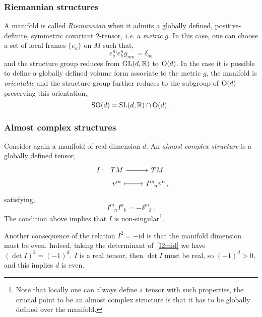 \documentclass[debug]{phd}
\begin{document}
					\subsubsection{Riemannian structures}
						A manifold is called \emph{Riemannian} when it admits a globally defined, positive-definite, symmetric covariant $2$-tensor, \emph{i.e.} a \emph{metric} $g$.
						In this case, one can choose a set of local frames $\{e_a\}$ on $M$ such that,
								\begin{equation}
									e_a^m e_b^n g_{mn} = \delta_{ab}
								\end{equation}
						and the structure group reduces from $\mathrm{GL}(d,\mathbb{R})$ to $\mathrm{O}(d)$.
						In the case it is possible to define a globally defined volume form associate to the metric $g$, the manifold is \emph{orientable} and the structure group further reduces to the subgroup of $\mathrm{O}(d)$ preserving this orientation,
								\begin{equation}
									\mathrm{SO}(d) = \mathrm{SL}(d,\mathbb{R}) \cap \mathrm{O}(d)\, .
								\end{equation}
					\subsubsection{Almost complex structures}
						Consider again a manifold of real dimension $d$. 
						An \emph{almost complex structure} is a globally defined tensor,
								\begin{equation}
									\begin{tikzcd}[row sep=tiny]
										I :\!\!\!\!\!\!\!\!\!\!\!\!\!\!\!\!\! & TM \arrow{r} & TM \\
 											& v^m \arrow[mapsto]{r} & I^m_{\phantom{m}n} v^n \, ,
									\end{tikzcd}
								\end{equation}
						satisfying,
								\begin{equation}
								\label{I2mid}
									I^m_{\phantom{m}n} I^n_{\phantom{n}k} = - \delta^m_{\phantom{m}k}\, .
								\end{equation}
						The condition above implies that $I$ is non-singular\footnote{%
							Note that locally one can always define a tensor with such properties, the crucial point to be an almost complex structure is that it has to be globally defined over the manifold.%
							}.
						
						Another consequence of the relation $I^2 = - \mathrm{id}$ is that the manifold dimension must be even.
						Indeed, taking the determinant of~\eqref{I2mid} we have $(\det I)^2 = (-1)^d$. 
						$I$ is a real tensor, then $\det I$ must be real, so $(-1)^d > 0$, and this implies $d$ is even.
						
\end{document}
